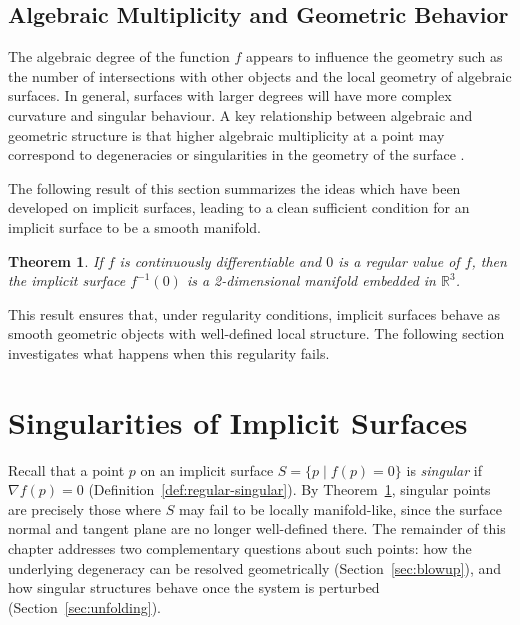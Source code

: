 \documentclass[12pt, a4paper, oneside]{book}
\theoremstyle{plain}
\newtheorem{theorem}{Theorem}[chapter]
\theoremstyle{definition}
\theoremstyle{remark}
\theoremstyle{definition}
\begin{document}
\subsection{Algebraic Multiplicity and Geometric Behavior}

The algebraic degree of the function $f$ appears to influence the geometry such as the number of intersections with other objects and the local geometry of algebraic surfaces. In general, surfaces with larger degrees will have more complex curvature and singular behaviour. A key relationship between algebraic and geometric structure is that higher algebraic multiplicity at a point may correspond to degeneracies or singularities in the geometry of the surface \cite{bloomenthal2000implicit}.

The following result of this section summarizes the ideas which have been developed on implicit surfaces, leading to a clean sufficient condition for an implicit surface to be a smooth manifold.

\begin{theorem}
\label{thm:manifold}
If $f$ is continuously differentiable and $0$ is a regular value of $f$, then the implicit surface $f^{-1}(0)$ is a 2-dimensional manifold embedded in $\mathbb{R}^3$.
\end{theorem}

This result ensures that, under regularity conditions, implicit surfaces behave as smooth geometric objects with well-defined local structure. The following section investigates what happens when this regularity fails.

\section{Singularities of Implicit Surfaces}
\label{sec:singularities}

Recall that a point $p$ on an implicit surface $S=\{p \mid f(p)=0\}$ is \emph{singular} if $\nabla f(p) = 0$ (Definition~\ref{def:regular-singular}). By Theorem~\ref{thm:manifold}, singular points are precisely those where $S$ may fail to be locally manifold-like, since the surface normal and tangent plane are no longer well-defined there. The remainder of this chapter addresses two complementary questions about such points: how the underlying degeneracy can be resolved geometrically (Section~\ref{sec:blowup}), and how singular structures behave once the system is perturbed (Section~\ref{sec:unfolding}).
\end{document}
